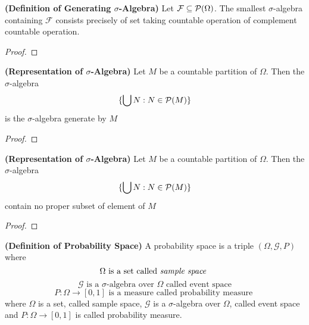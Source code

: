 \documentclass{report}
\begin{document}
\begin{theorem}
\label{1.1.8}
\textbf{(Definition of Generating $\sigma$-Algebra)} Let $\mathcal{F}\subseteq \mathcal{P}(\Omega)$. The smallest $\sigma$-algebra containing $\mathcal{F}$ consists precisely of set taking countable operation of complement countable operation.
\end{theorem}
\begin{proof}
\end{proof}
\begin{theorem}
\textbf{(Representation of $\sigma$-Algebra)} Let $M$ be a countable partition of  $\Omega$. Then the $\sigma$-algebra 
\begin{equation}
\{ \bigcup N: N\in\mathcal{P}(M) \}
\end{equation}
is the $\sigma$-algebra generate by $M$
\end{theorem}
\begin{proof}
\end{proof}
\begin{theorem}
\textbf{(Representation of $\sigma$-Algebra)} Let $M$ be a countable partition of  $\Omega$. Then the $\sigma$-algebra 
\begin{equation}
\{ \bigcup N: N \in \mathcal{P}(M) \}
\end{equation}
contain no proper subset of element of $M$
\end{theorem}
\begin{proof}
\end{proof}
\begin{definition}
\label{1.1.9}
\textbf{(Definition of Probability Space)} A probability space is a triple $(\Omega,\mathcal{\mathcal{G}},P)$ where 
\begin{equation}
\Omega \text{ is a set called \textit{sample space} }
\end{equation}
\begin{equation}
\mathcal{G} \text{ is a $\sigma$-algebra over $\Omega$ called event space}
\end{equation}
\begin{equation}
P:\Omega\rightarrow [0,1]\text{ is a measure called probability measure }
\end{equation}
where $\Omega$ is a set, called sample space, $\mathcal{G}$ is a $\sigma$-algebra over $\Omega$, called event space and $P:\Omega\rightarrow [0,1]$ is called probability measure. 
\end{definition}
\end{document}
